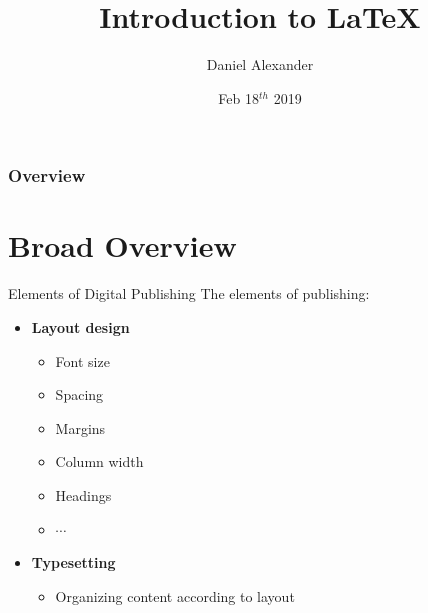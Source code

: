 \documentclass{beamer}
\title[\LaTeX]{Introduction to \LaTeX} %
\author{Daniel Alexander} %
\institute[CISER] %
{
CISER, Cornell University \\ %
\medskip
\textit{dra65@cornell.edu} %
}
\date{Feb 18$^{th}$ 2019} %
\begin{document}
\begin{frame}
\titlepage %
\end{frame}

\begin{frame}
\frametitle{Overview} %
\tableofcontents %
\end{frame}


\section{Broad Overview} 
\begin{frame}{Elements of Digital Publishing}
 The elements of publishing:
 \begin{itemize}
 \item \textbf{Layout design}
 \begin{itemize}
  \item Font size
  \item Spacing
  \item Margins
  \item Column width
  \item Headings
  \item $\cdots$
 \end{itemize}
 \pause
 \item \textbf{Typesetting}
 \begin{itemize}
  \item Organizing content according to layout
 \end{itemize}
\end{itemize}
\end{frame}
\end{document}
